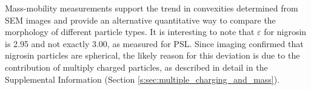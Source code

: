 Mass-mobility measurements support the trend in convexities determined from SEM images and provide an alternative quantitative way to compare the morphology of different particle types. It is interesting to note that $\varepsilon$ for nigrosin is 2.95 and not exactly 3.00, as measured for PSL. Since imaging confirmed that nigrosin particles are spherical, the likely reason for this deviation is due to the contribution of multiply charged particles, as described in detail in the Supplemental Information (Section \ref{s:sec:multiple_charging_and_mass}).
